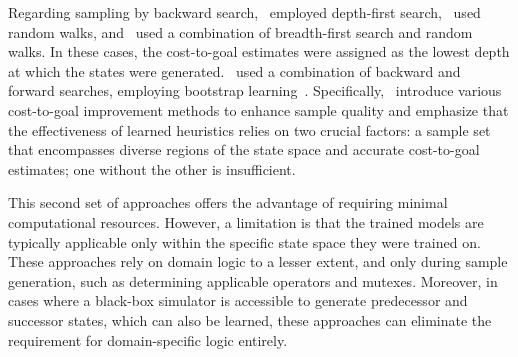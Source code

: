 \documentclass[ppgc,diss,english]{iiufrgs}
\begin{document}
Regarding sampling by backward search,~\citet{Yu.etal/2020} employed depth-first search,~\citet{OToole/2022} used random walks, and~\citet{Bettker.etal/2022} used a combination of breadth-first search and random walks. In these cases, the cost-to-goal estimates were assigned as the lowest depth at which the states were generated.~\citet{Ferber.etal/2022} used a combination of backward and forward searches, employing bootstrap learning~\cite{Arfaee.etal/2011}.
Specifically,~\citet{Bettker.etal/2022} introduce various cost-to-goal improvement methods to enhance sample quality and emphasize that the effectiveness of learned heuristics relies on two crucial factors: a sample set that encompasses diverse regions of the state space and accurate cost-to-goal estimates; one without the other is insufficient.


This second set of approaches offers the advantage of requiring minimal computational resources. However, a limitation is that the trained models are typically applicable only within the specific state space they were trained on. These approaches rely on domain logic to a lesser extent, and only during sample generation, such as determining applicable operators and mutexes. Moreover, in cases where a black-box simulator is accessible to generate predecessor and successor states, which can also be learned, these approaches can eliminate the requirement for domain-specific logic entirely.


%
%
\end{document}
